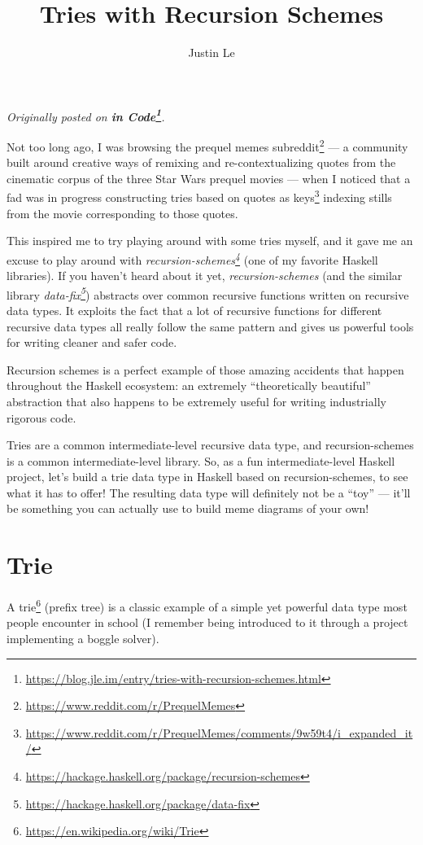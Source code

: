 \documentclass[]{article}
\title{Tries with Recursion Schemes}
\author{Justin Le}
\renewcommand{\href}[2]{#2\footnote{\url{#1}}}
\begin{document}
\maketitle

\emph{Originally posted on
\textbf{\href{https://blog.jle.im/entry/tries-with-recursion-schemes.html}{in
Code}}.}

Not too long ago, I was browsing the
\href{https://www.reddit.com/r/PrequelMemes}{prequel memes subreddit} --- a
community built around creative ways of remixing and re-contextualizing quotes
from the cinematic corpus of the three Star Wars prequel movies --- when I
noticed that a fad was in progress
\href{https://www.reddit.com/r/PrequelMemes/comments/9w59t4/i_expanded_it/}{constructing
tries based on quotes as keys} indexing stills from the movie corresponding to
those quotes.

This inspired me to try playing around with some tries myself, and it gave me an
excuse to play around with
\emph{\href{https://hackage.haskell.org/package/recursion-schemes}{recursion-schemes}}
(one of my favorite Haskell libraries). If you haven't heard about it yet,
\emph{recursion-schemes} (and the similar library
\emph{\href{https://hackage.haskell.org/package/data-fix}{data-fix}}) abstracts
over common recursive functions written on recursive data types. It exploits the
fact that a lot of recursive functions for different recursive data types all
really follow the same pattern and gives us powerful tools for writing cleaner
and safer code.

Recursion schemes is a perfect example of those amazing accidents that happen
throughout the Haskell ecosystem: an extremely ``theoretically beautiful''
abstraction that also happens to be extremely useful for writing industrially
rigorous code.

Tries are a common intermediate-level recursive data type, and recursion-schemes
is a common intermediate-level library. So, as a fun intermediate-level Haskell
project, let's build a trie data type in Haskell based on recursion-schemes, to
see what it has to offer! The resulting data type will definitely not be a
``toy'' --- it'll be something you can actually use to build meme diagrams of
your own!

\hypertarget{trie}{%
\section{Trie}\label{trie}}

A \href{https://en.wikipedia.org/wiki/Trie}{trie} (prefix tree) is a classic
example of a simple yet powerful data type most people encounter in school (I
remember being introduced to it through a project implementing a boggle solver).
\end{document}
